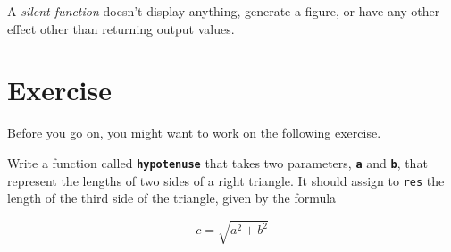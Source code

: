 \documentclass[../../book.tex]{subfiles}
\begin{document}
A \emph{silent function} doesn't display anything, generate a figure, or have any other effect other than returning output values.


\section{Exercise}

Before you go on, you might want to work on the following exercise.

\begin{ex}
\label{hypotenuse_exercise}
Write a function called \textbf{\lstinline{hypotenuse}} that takes two parameters, \textbf{\lstinline{a}} and \textbf{\lstinline{b}}, that represent the lengths of two sides of a right triangle.  It should assign to \lstinline{res} the length of the third side of the triangle, given by the formula

\[ c = \sqrt{a^2 + b^2} \]

\end{ex}
\end{document}
